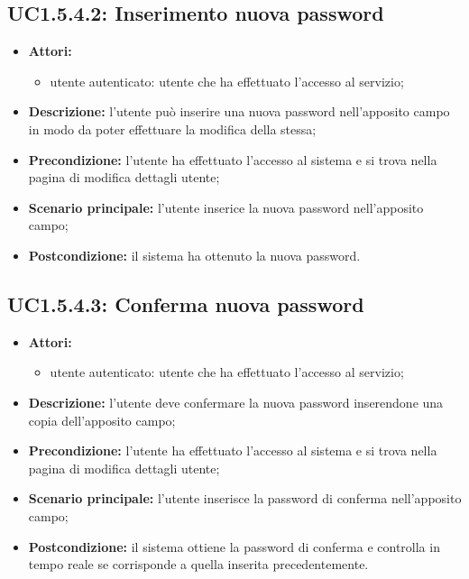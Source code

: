 \subsection{UC1.5.4.2: Inserimento nuova password}
\begin{itemize}
	\item \textbf{Attori:}
	\begin{itemize}
		\item utente autenticato: utente che ha effettuato l'accesso al servizio;
	\end{itemize}
	\item \textbf{Descrizione:} l'utente può inserire una nuova password nell'apposito campo in modo da poter effettuare la modifica della stessa;
	\item \textbf{Precondizione:} l'utente ha effettuato l'accesso al sistema e si trova nella pagina di modifica dettagli utente;
	\item \textbf{Scenario principale:} l'utente inserice la nuova password nell'apposito campo;
	\item \textbf{Postcondizione:} il sistema ha ottenuto la nuova password.
\end{itemize}

\subsection{UC1.5.4.3: Conferma nuova password}
\begin{itemize}
	\item \textbf{Attori:}
	\begin{itemize}
		\item utente autenticato: utente che ha effettuato l'accesso al servizio;
	\end{itemize}
	\item \textbf{Descrizione:} l'utente deve confermare la nuova password inserendone una copia dell'apposito campo;
	\item \textbf{Precondizione:} l'utente ha effettuato l'accesso al sistema e si trova nella pagina di modifica dettagli utente;
	\item \textbf{Scenario principale:} l'utente inserisce la password di conferma nell'apposito campo;
	\item \textbf{Postcondizione:} il sistema ottiene la password di conferma e controlla in tempo reale se corrisponde a quella inserita precedentemente.
\end{itemize}

